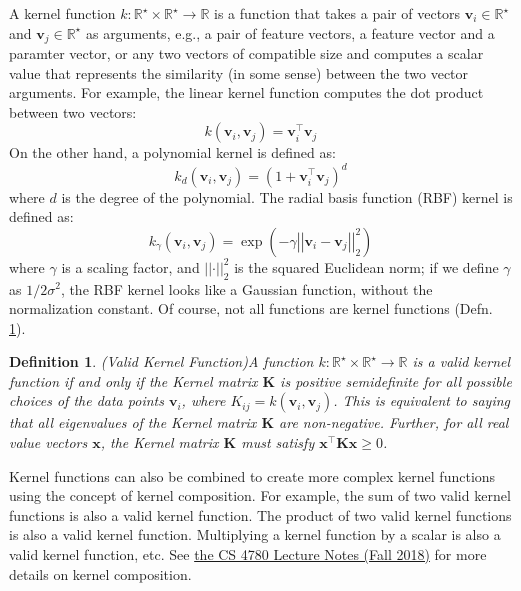 \documentclass{article}[11pt]
\newtheorem{defn}{Definition}
\def\R{\mathbb{R}}
\newcommand{\norm}[1]{\left|\left|#1\right|\right|}
\begin{document}
A kernel function $k:\mathbb{R}^{\star}\times\R^{\star}\to\R$ is a function that takes a pair of vectors 
$\mathbf{v}_i\in\R^{\star}$ and $\mathbf{v}_j\in\R^{\star}$ as arguments, 
e.g., a pair of feature vectors, a feature vector and a paramter vector, or any two vectors of compatible size 
and computes a scalar value that represents the similarity (in some sense) between the two vector arguments.
For example, the linear kernel function computes the dot product between two vectors:
\begin{equation}
k(\mathbf{v}_i, \mathbf{v}_j) = \mathbf{v}_i^{\top}\mathbf{v}_j
\end{equation}
On the other hand, a polynomial kernel is defined as:
\begin{equation}
k_{d}(\mathbf{v}_i, \mathbf{v}_j) = (1+\mathbf{v}_i^{\top}\mathbf{v}_j)^d
\end{equation}
where $d$ is the degree of the polynomial. The radial basis function (RBF) kernel is defined as:
\begin{equation}
k_{\gamma}(\mathbf{v}_i, \mathbf{v}_j) = \exp(-\gamma \norm{\mathbf{v}_i - \mathbf{v}_j}_{2}^2)
\end{equation}
where $\gamma$ is a scaling factor, and $\norm{\cdot}^{2}_{2}$ is the squared Euclidean norm;
if we define $\gamma$ as ${1}/{2\sigma^2}$, the RBF kernel looks like a Gaussian function, without the normalization constant.
Of course, not all functions are kernel functions (Defn. \ref{def:kernel-valid}).
\begin{defn}{(Valid Kernel Function)}\label{def:kernel-valid}
A function $k:\mathbb{R}^{\star}\times\R^{\star}\to\R$ is a valid kernel function if and only if the Kernel matrix $\mathbf{K}$ is positive 
semidefinite for all possible choices of the data points $\mathbf{v}_i$, where $K_{ij} = k(\mathbf{v}_i, \mathbf{v}_j)$.
This is equivalent to saying that all eigenvalues of the Kernel matrix $\mathbf{K}$ are non-negative.
Further, for all real value vectors $\mathbf{x}$, the Kernel matrix $\mathbf{K}$ must satisfy $\mathbf{x}^{\top}\mathbf{K}\mathbf{x} \geq 0$.
\end{defn}
Kernel functions can also be combined to create more complex kernel functions using the concept of kernel composition.
For example, the sum of two valid kernel functions is also a valid kernel function. 
The product of two valid kernel functions is also a valid kernel function. 
Multiplying a kernel function by a scalar is also a valid kernel function, etc.
See \href{https://www.cs.cornell.edu/courses/cs4780/2018fa/lectures/lecturenote14.html}{the CS 4780 Lecture Notes (Fall 2018)} for more details on kernel composition.
\end{document}
